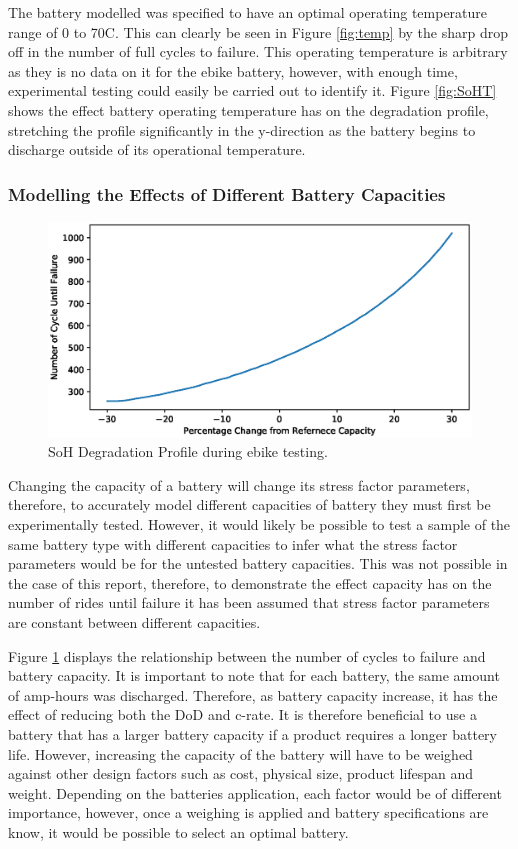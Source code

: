 \documentclass[a4paper, 10pt]{article}
\numberwithin{equation}{section}
\begin{document}
The battery modelled was specified to have an optimal operating temperature range of 0 to 70\textdegree C. This can clearly be seen in Figure \ref{fig:temp} by the sharp drop off in the number of full cycles to failure. This operating temperature is arbitrary as they is no data on it for the ebike battery, however, with enough time, experimental testing could easily be carried out to identify it. Figure \ref{fig:SoHT} shows the effect battery operating temperature has on the degradation profile, stretching the profile significantly in the y-direction as the battery begins to discharge outside of its operational temperature.

\FloatBarrier
\subsubsection{Modelling the Effects of Different Battery Capacities}
\begin{figure}[h]
    \centering
    \includegraphics[width=0.7\linewidth]{images/F6_Cap.eps}
    \caption{SoH Degradation Profile during ebike testing.}
    \label{fig:Cap}
\end{figure}
Changing the capacity of a battery will change its stress factor parameters, therefore, to accurately model different capacities of battery they must first be experimentally tested. However, it would likely be possible to test a sample of the same battery type with different capacities to infer what the stress factor parameters would be for the untested battery capacities. This was not possible in the case of this report, therefore, to demonstrate the effect capacity has on the number of rides until failure it has been assumed that stress factor parameters are constant between different capacities.

Figure \ref{fig:Cap} displays the relationship between the number of cycles to failure and battery capacity. It is important to note that for each battery, the same amount of amp-hours was discharged. Therefore, as battery capacity increase, it has the effect of reducing both the DoD and c-rate. It is therefore beneficial to use a battery that has a larger battery capacity if a product requires a longer battery life. However, increasing the capacity of the battery will have to be weighed against other design factors such as cost, physical size, product lifespan and weight. Depending on the batteries application, each factor would be of different importance, however, once a weighing is applied and battery specifications are know, it would be possible to select an optimal battery.
\end{document}
